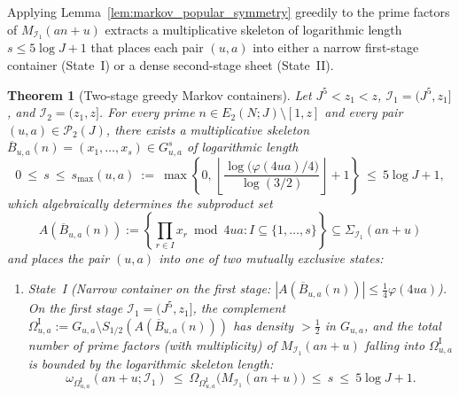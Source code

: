\documentclass[11pt, a4paper]{article}
\theoremstyle{plain}
\newtheorem{theorem}{Theorem}[section]
\theoremstyle{definition}
\begin{document}
Applying Lemma~\ref{lem:markov_popular_symmetry} greedily to the prime factors of $M_{\mathcal{I}_1}(an+u)$ extracts a multiplicative skeleton of logarithmic length $s\le 5\log J+1$ that places each pair $(u,a)$ into either a narrow first-stage container (State~I) or a dense second-stage sheet (State~II).

\begin{theorem}[Two-stage greedy Markov containers]\label{thm:multiplicative_container_scarcity_elimination}
Let $J^{5}<z_1<z$, $\mathcal{I}_1=(J^{5},z_1]$, and $\mathcal{I}_2=(z_1,z]$. For every prime $n\in E_2(N;J)\setminus[1,z]$ and every pair $(u,a)\in\mathcal{P}_2(J)$, there exists a multiplicative skeleton $\overline{B}_{u,a}(n)=(x_1,\dots,x_s)\in G_{u,a}^{s}$ of logarithmic length
\begin{equation}\label{eq:skeleton_logarithmic_length}
0\ \le\ s\ \le\ s_{\max}(u,a)\ :=\ \max\!\left\{0,\,\left\lfloor\frac{\log\big(\varphi(4ua)/4\big)}{\log(3/2)}\right\rfloor+1\right\}\ \le\ 5\log J+1,
\end{equation}
which algebraically determines the subproduct set 
\[
A(\overline{B}_{u,a}(n)):=\left\{\prod_{r\in I}x_r\bmod 4ua:I\subseteq\{1,\dots,s\}\right\}\subseteq\Sigma_{\mathcal{I}_1}(an+u)
\]
and places the pair $(u,a)$ into one of two mutually exclusive states:
\begin{enumerate}[label=(\roman*)]
    \item \emph{State~I (Narrow container on the first stage: $|A(\overline{B}_{u,a}(n))|\le\frac14\varphi(4ua)$).} 
    On the first stage $\mathcal{I}_1=(J^{5},z_1]$, the complement $\Omega_{u,a}^{\mathrm{I}}:=G_{u,a}\setminus S_{1/2}(A(\overline{B}_{u,a}(n)))$ has density $>\frac12$ in $G_{u,a}$, and the total number of prime factors (with multiplicity) of $M_{\mathcal{I}_1}(an+u)$ falling into $\Omega_{u,a}^{\mathrm{I}}$ is bounded by the logarithmic skeleton length:
    \begin{equation}\label{eq:state1_logarithmic_collisions}
    \omega_{\Omega_{u,a}^{\mathrm{I}}}(an+u;\mathcal{I}_1)\ \le\ \Omega_{\Omega_{u,a}^{\mathrm{I}}}\big(M_{\mathcal{I}_1}(an+u)\big)\ \le\ s\ \le\ 5\log J+1.
    \end{equation}
    

\end{enumerate}
\end{theorem}
\end{document}

